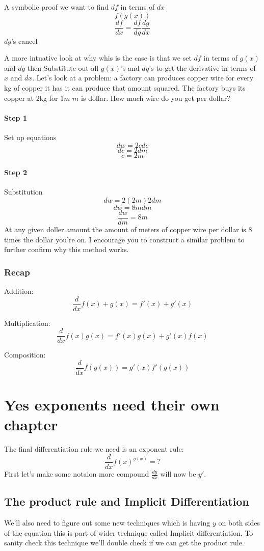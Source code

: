 \documentclass[12pt]{book}
\begin{document}
A symbolic proof we want to find $df$ in terms of $dx$
$$f(g(x))$$
$$\frac{df}{dx} = \frac{df}{dg}\frac{dg}{dx}$$
$dg$'s cancel

A more intuative look at why whis is the case is that we set $df$ in terms of $g(x)$ and $dg$ then Substitute out all $g(x)$'s and $dg$'s to get the derivative in terms of $x$ and $dx$. Let's look at a problem:
a factory can produces copper wire for every kg of copper it has it can produce that amount squared. The factory buys its copper at 2kg for 1$m$ $m$ is dollar. How much wire do you get per dollar?
\subsubsection{Step 1}
Set up equations
$$dw = 2cdc$$
$$dc = 2dm$$
$$c = 2m$$

\subsubsection{Step 2}
	Substitution
	$$dw = 2(2m)2dm$$
	$$dw = 8mdm$$
	$$\frac{dw}{dm} = 8m$$
	At any given doller amount the amount of meters of copper wire per dollar is 8 times the dollar you're on. I encourage you to construct a similar problem to further confirm why this method works.

\subsection{Recap}
\itemize
	\item Addition:
	$$\frac{d}{dx}f(x)+g(x) = f'(x) + g'(x)$$
	\item Multiplication:
	$$\frac{d}{dx}f(x)g(x) = f'(x)g(x) + g'(x)f(x)$$
	\item Composition:
	$$\frac{d}{dx}f(g(x)) = g'(x)f'(g(x))$$

\chapter{Yes exponents need their own chapter}
The final differentiation rule we need is an exponent rule:
$$\frac{d}{dx}f(x)^{g(x)} = ?$$
First let's make some notaion more compound $\frac{dy}{dx}$ will now be $y'$. 
\section{The product rule and Implicit Differentiation}
We'll also need to figure out some new techniques which is having $y$ on both sides of the equation this is part of wider technique called Implicit differentiation. To sanity check this technique we'll double check if we can get the product rule.
\end{document}
